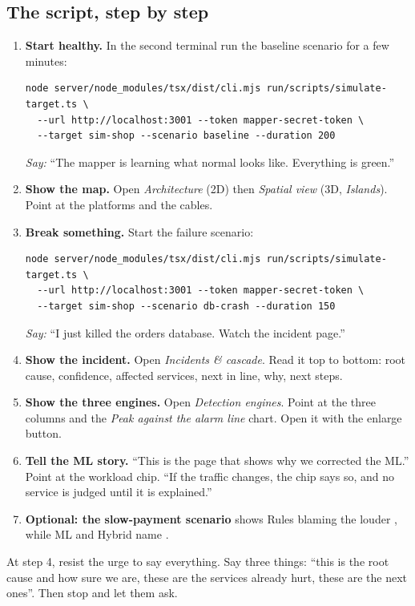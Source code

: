 \subsection{The script, step by step}
\begin{enumerate}
\item \textbf{Start healthy.} In the second terminal run the baseline scenario for a few minutes:
\begin{verbatim}
node server/node_modules/tsx/dist/cli.mjs run/scripts/simulate-target.ts \
  --url http://localhost:3001 --token mapper-secret-token \
  --target sim-shop --scenario baseline --duration 200
\end{verbatim}
\emph{Say:} ``The mapper is learning what normal looks like. Everything is green.''
\item \textbf{Show the map.} Open \emph{Architecture} (2D) then \emph{Spatial view} (3D, \emph{Islands}). Point at the platforms and the cables.
\item \textbf{Break something.} Start the failure scenario:
\begin{verbatim}
node server/node_modules/tsx/dist/cli.mjs run/scripts/simulate-target.ts \
  --url http://localhost:3001 --token mapper-secret-token \
  --target sim-shop --scenario db-crash --duration 150
\end{verbatim}
\emph{Say:} ``I just killed the orders database. Watch the incident page.''
\item \textbf{Show the incident.} Open \emph{Incidents \& cascade}. Read it top to bottom: root cause, confidence, affected services, next in line, why, next steps.
\item \textbf{Show the three engines.} Open \emph{Detection engines}. Point at the three columns and the \emph{Peak against the alarm line} chart. Open it with the enlarge button.
\item \textbf{Tell the ML story.} ``This is the page that shows why we corrected the ML.'' Point at the workload chip. ``If the traffic changes, the chip says so, and no service is judged until it is explained.''
\item \textbf{Optional: the slow-payment scenario} shows Rules blaming the louder , while ML and Hybrid name .
\end{enumerate}

\begin{saybox}
At step 4, resist the urge to say everything. Say three things: ``this is the root cause and how sure we are, these are the services already hurt, these are the next ones''. Then stop and let them ask.
\end{saybox}

